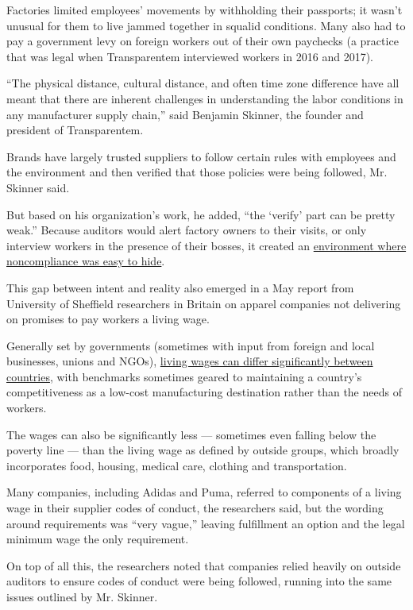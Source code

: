 Factories limited employees' movements by withholding their passports;
it wasn't unusual for them to live jammed together in squalid
conditions. Many also had to pay a government levy on foreign workers
out of their own paychecks (a practice that was legal when Transparentem
interviewed workers in 2016 and 2017).

``The physical distance, cultural distance, and often time zone
difference have all meant that there are inherent challenges in
understanding the labor conditions in any manufacturer supply chain,''
said Benjamin Skinner, the founder and president of Transparentem.

Brands have largely trusted suppliers to follow certain rules with
employees and the environment and then verified that those policies were
being followed, Mr. Skinner said.

But based on his organization's work, he added, ``the `verify' part can
be pretty weak.'' Because auditors would alert factory owners to their
visits, or only interview workers in the presence of their bosses, it
created an
\href{https://www.nytimes3xbfgragh.onion/2019/02/06/fashion/india-fast-fashion-homeworkers.html}{environment
where noncompliance was easy to hide}.

This gap between intent and reality also emerged in a May report from
University of Sheffield researchers in Britain on apparel companies not
delivering on promises to pay workers a living wage.

Generally set by governments (sometimes with input from foreign and
local businesses, unions and NGOs),
\href{https://www.nytimes3xbfgragh.onion/2019/06/05/smarter-living/what-a-living-wage-actually-means.html}{living
wages can differ significantly between countries}, with benchmarks
sometimes geared to maintaining a country's competitiveness as a
low-cost manufacturing destination rather than the needs of workers.

The wages can also be significantly less --- sometimes even falling
below the poverty line --- than the living wage as defined by outside
groups, which broadly incorporates food, housing, medical care, clothing
and transportation.

Many companies, including Adidas and Puma, referred to components of a
living wage in their supplier codes of conduct, the researchers said,
but the wording around requirements was ``very vague,'' leaving
fulfillment an option and the legal minimum wage the only requirement.

On top of all this, the researchers noted that companies relied heavily
on outside auditors to ensure codes of conduct were being followed,
running into the same issues outlined by Mr. Skinner.

